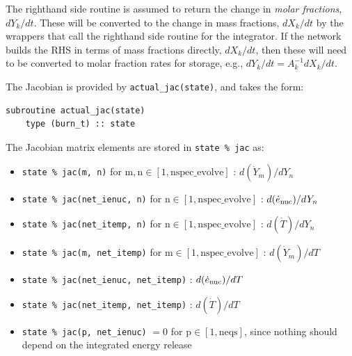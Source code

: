 \begin{tcolorbox}
The righthand side routine is assumed to return the change in {\em molar fractions},
$dY_k/dt$.  These will be converted to the change in mass fractions, $dX_k/dt$
by the wrappers that call the righthand side routine for the integrator.
If the network builds the RHS in terms of mass fractions directly, $dX_k/dt$, then
these will need to be converted to molar fraction rates for storage, e.g.,
$dY_k/dt = A_k^{-1} dX_k/dt$.
\end{tcolorbox}

The Jacobian is provided by {\tt actual\_jac(state)}, and takes the
form:
\begin{lstlisting}[language={[95]fortran}]
  subroutine actual_jac(state)
    type (burn_t) :: state
\end{lstlisting}
The Jacobian matrix elements are stored in {\tt state \% jac} as:
\begin{itemize}
\item {\tt state \% jac(m, n)} for $\mathrm{m}, \mathrm{n} \in [1, \mathrm{nspec\_evolve}]$ :
  $d(\dot{Y}_m)/dY_n$

\item {\tt state \% jac(net\_ienuc, n)} for $\mathrm{n} \in [1, \mathrm{nspec\_evolve}]$ :
  $d({{\dot{e}_\mathrm{nuc}}})/dY_n$

\item {\tt state \% jac(net\_itemp, n)} for $\mathrm{n} \in [1, \mathrm{nspec\_evolve}]$ :
  $d(\dot{T})/dY_n$

\item {\tt state \% jac(m, net\_itemp)} for $\mathrm{m} \in [1, \mathrm{nspec\_evolve}]$ :
  $d(\dot{Y}_m)/dT$

\item {\tt state \% jac(net\_ienuc, net\_itemp)} :
  $d({{\dot{e}_\mathrm{nuc}}})/dT$

\item {\tt state \% jac(net\_itemp, net\_itemp)} :
  $d(\dot{T})/dT$

\item {\tt state \% jac(p, net\_ienuc)} $= 0$ for $\mathrm{p} \in [1, \mathrm{neqs}]$, since nothing
  should depend on the integrated energy release

\end{itemize}

